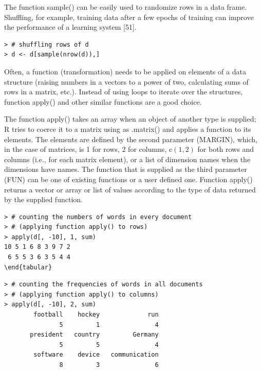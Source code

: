 \documentclass[11pt,openany,executivepaper]{book}
\begin{document}
The function sample() can be easily used to randomize rows in a data frame. Shuffling, for example, training data after a few epochs of training can improve the performance of a learning system [51].

\begin{verbatim}
> # shuffling rows of d
> d <- d[sample(nrow(d)),]
\end{verbatim}

Often, a function (transformation) needs to be applied on elements of a data structure (raising numbers in a vectors to a power of two, calculating sums of rows in a matrix, etc.). Instead of using loops to iterate over the structures, function apply() and other similar functions are a good choice.

The function apply() takes an array when an object of another type is supplied; R tries to coerce it to a matrix using as .matrix() and applies a function to its elements. The elements are defined by the second parameter (MARGIN), which, in the case of matrices, is 1 for rows, 2 for columns, $\mathrm{c}(1,2)$ for both rows and columns (i.e., for each matrix element), or a list of dimension names when the dimensions have names. The function that is supplied as the third parameter (FUN) can be one of existing functions or a user defined one. Function apply() returns a vector or array or list of values according to the type of data returned by the supplied function.

\begin{verbatim}
> # counting the numbers of words in every document
> # (applying function apply() to rows)
> apply(d[, -10], 1, sum)
10 5 1 6 8 3 9 7 2
 6 5 5 3 6 3 5 4 4
\end{tabular}
\end{verbatim}

\begin{verbatim}
> # counting the frequencies of words in all documents
> # (applying function apply() to columns)
> apply(d[, -10], 2, sum)
        football    hockey             run
               5         1               4
       president   country         Germany
               5         5               4
        software    device   communication
               8         3               6
\end{verbatim}
\end{document}

